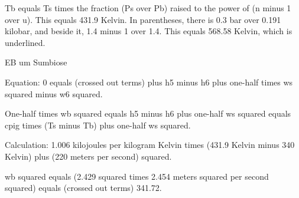 Tb equals Ts times the fraction (Ps over Pb) raised to the power of (n minus 1 over u). This equals 431.9 Kelvin. In parentheses, there is 0.3 bar over 0.191 kilobar, and beside it, 1.4 minus 1 over 1.4. This equals 568.58 Kelvin, which is underlined.

EB um Sumbiose

Equation: 0 equals (crossed out terms) plus h5 minus h6 plus one-half times ws squared minus w6 squared.

One-half times wb squared equals h5 minus h6 plus one-half ws squared equals cpig times (Ts minus Tb) plus one-half ws squared.

Calculation: 1.006 kilojoules per kilogram Kelvin times (431.9 Kelvin minus 340 Kelvin) plus (220 meters per second) squared.

wb squared equals (2.429 squared times 2.454 meters squared per second squared) equals (crossed out terms) 341.72.